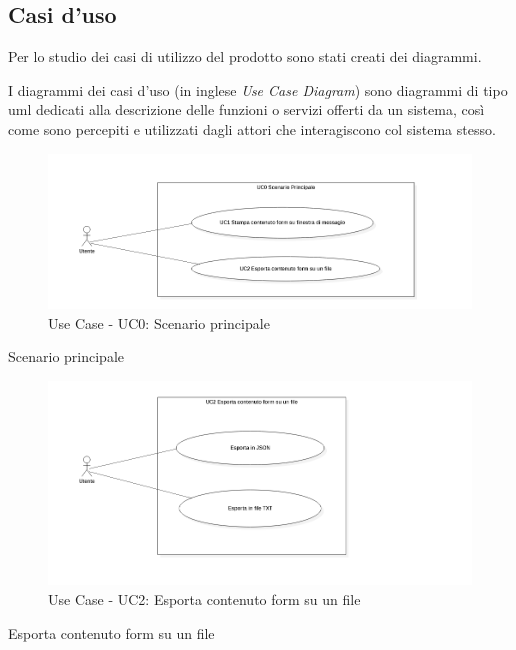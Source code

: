 \subsection{Casi d'uso}
\begin{flushleft}
	Per lo studio dei casi di utilizzo del prodotto sono stati creati dei diagrammi.
	
	I diagrammi dei casi d'uso (in inglese \emph{Use Case Diagram}) sono diagrammi di tipo \gls{uml} dedicati alla descrizione delle funzioni o servizi offerti da un sistema, così come sono percepiti e utilizzati dagli attori che interagiscono col sistema stesso.
\end{flushleft}


\begin{figure}[!h] 
	\centering 
	\includegraphics[scale = 0.4]{immagini/usecase/usecase-addon-uc0.png} 
	\caption{Use Case - UC0: Scenario principale}
\end{figure}
\begin{usecase}{0}{Scenario principale}
	\label{uc:scenario-principale}
\end{usecase}
\begin{figure}[!h] 
	\centering 
	\includegraphics[scale = 0.4]{immagini/usecase/usecase-addon-uc2.png} 
	\caption{Use Case - UC2: Esporta contenuto form su un file}
\end{figure}
\begin{usecase}{2}{Esporta contenuto form su un file}
	\label{uc:esporta-file}
\end{usecase}

